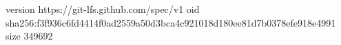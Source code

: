 version https://git-lfs.github.com/spec/v1
oid sha256:f3f936c6fd4414f0ad2559a50d3bca4c921018d180ee81d7b0378efe918e4991
size 349692
